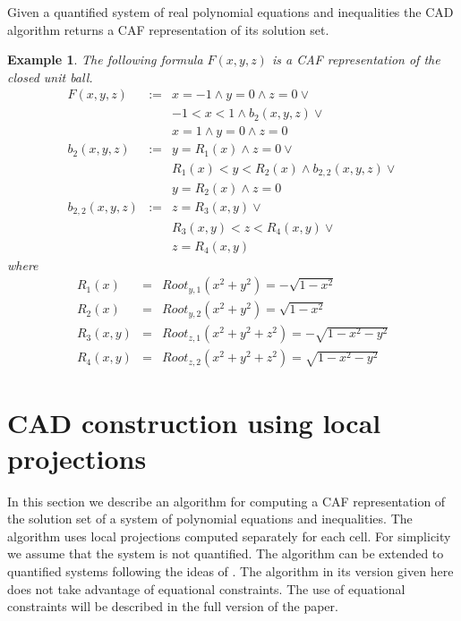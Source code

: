 \documentclass[english]{amsart}
\numberwithin{equation}{section}
\numberwithin{figure}{section}
\newtheorem{example}[thm]{Example}
\begin{document}
Given a quantified system of real polynomial equations and inequalities
the CAD algorithm \cite{S7} returns a CAF representation of its solution
set. 
\begin{example}
The following formula $F(x,y,z)$ is a CAF representation of the closed
unit ball.\begin{eqnarray*}
F(x,y,z) & := & x=-1\wedge y=0\wedge z=0\vee\\
 &  & -1<x<1\wedge b_{2}(x,y,z)\vee\\
 &  & x=1\wedge y=0\wedge z=0\\
b_{2}(x,y,z) & := & y=R_{1}(x)\wedge z=0\vee\\
 &  & R_{1}(x)<y<R_{2}(x)\wedge b_{2,2}(x,y,z)\vee\\
 &  & y=R_{2}(x)\wedge z=0\\
b_{2,2}(x,y,z) & := & z=R_{3}(x,y)\vee\\
 &  & R_{3}(x,y)<z<R_{4}(x,y)\vee\\
 &  & z=R_{4}(x,y)\end{eqnarray*}
where \begin{eqnarray*}
R_{1}(x) & = & Root_{y,1}(x^{2}+y^{2})=-\sqrt{1-x^{2}}\\
R_{2}(x) & = & Root_{y,2}(x^{2}+y^{2})=\sqrt{1-x^{2}}\\
R_{3}(x,y) & = & Root_{z,1}(x^{2}+y^{2}+z^{2})=-\sqrt{1-x^{2}-y^{2}}\\
R_{4}(x,y) & = & Root_{z,2}(x^{2}+y^{2}+z^{2})=\sqrt{1-x^{2}-y^{2}}\end{eqnarray*}

\end{example}

\section{CAD construction using local projections}

In this section we describe an algorithm for computing a CAF representation
of the solution set of a system of polynomial equations and inequalities.
The algorithm uses local projections computed separately for each
cell. For simplicity we assume that the system is not quantified.
The algorithm can be extended to quantified systems following the
ideas of \cite{CH}. The algorithm in its version given here does
not take advantage of equational constraints. The use of equational
constraints will be described in the full version of the paper.
\end{document}
